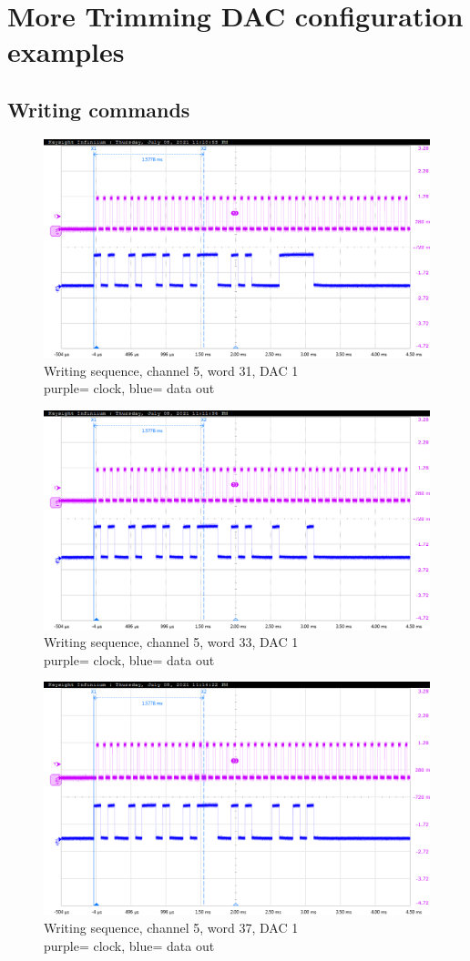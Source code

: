 \pagestyle{plain}
\appendix
\chapter{More Trimming DAC configuration examples}\label{DacAppendix}
\section{Writing commands}
\begin{figure}[H]
	\centering
	\includegraphics[width=0.6\linewidth]{IMG/ch5/probe/09-08-2021_ch05-write31-baselinedac1}
	\caption{Writing sequence, channel 5, word 31, DAC 1\\{\color{magenta}purple}= clock, {\color{blue}blue}= data out}
	\label{fig:ch05write31}
\end{figure}

\begin{figure}[H]
	\centering
	\includegraphics[width=0.6\linewidth]{IMG/ch5/probe/09-08-2021_ch05-write33-baselinedac1}
	\caption{Writing sequence, channel 5, word 33, DAC 1\\{\color{magenta}purple}= clock, {\color{blue}blue}= data out}
	\label{fig:ch05write33}
\end{figure}
\begin{figure}[H]
	\centering
	\includegraphics[width=0.6\linewidth]{IMG/ch5/probe/09-08-2021_ch05-write37-baselinedac1}
	\caption{Writing sequence, channel 5, word 37, DAC 1\\{\color{magenta}purple}= clock, {\color{blue}blue}= data out}
	\label{fig:ch05write37}
\end{figure}

